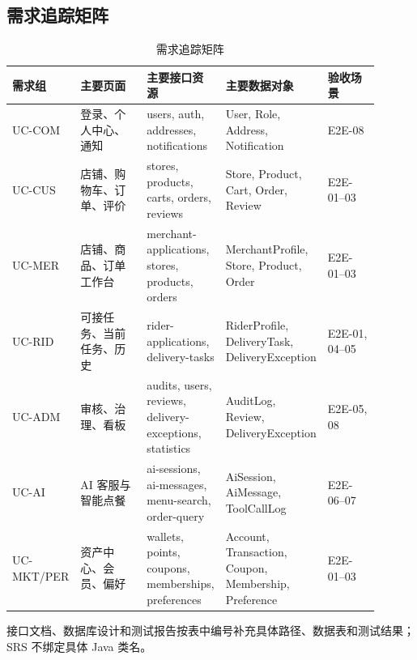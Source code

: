 \subsection{需求追踪矩阵}

\begin{longtable}{|L{0.17\linewidth}|L{0.20\linewidth}|L{0.18\linewidth}|L{0.20\linewidth}|L{0.15\linewidth}|}
\caption{需求追踪矩阵}\label{tab:traceability}\\ \hline
\textbf{需求组} & \textbf{主要页面} & \textbf{主要接口资源} & \textbf{主要数据对象} & \textbf{验收场景} \\ \hline
UC-COM & 登录、个人中心、通知 & users, auth, addresses, notifications & User, Role, Address, Notification & E2E-08 \\ \hline
UC-CUS & 店铺、购物车、订单、评价 & stores, products, carts, orders, reviews & Store, Product, Cart, Order, Review & E2E-01--03 \\ \hline
UC-MER & 店铺、商品、订单工作台 & merchant-applications, stores, products, orders & Merchant\-Profile, Store, Product, Order & E2E-01--03 \\ \hline
UC-RID & 可接任务、当前任务、历史 & rider-applications, delivery-tasks & Rider\-Profile, Delivery\-Task, Delivery\-Exception & E2E-01, 04--05 \\ \hline
UC-ADM & 审核、治理、看板 & audits, users, reviews, delivery-exceptions, statistics & AuditLog, Review, DeliveryException & E2E-05, 08 \\ \hline
UC-AI & AI 客服与智能点餐 & ai-sessions, ai-messages, menu-search, order-query & AiSession, AiMessage, ToolCallLog & E2E-06--07 \\ \hline
UC-MKT/PER & 资产中心、会员、偏好 & wallets, points, coupons, memberships, preferences & Account, Transaction, Coupon, Membership, Preference & E2E-01--03 \\ \hline
\end{longtable}

接口文档、数据库设计和测试报告按表中编号补充具体路径、数据表和测试结果；SRS 不绑定具体 Java 类名。
